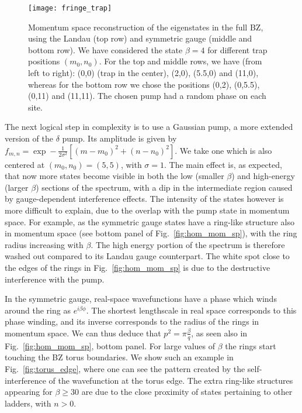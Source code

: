 \documentclass[twocolumn, 10pt, aps, superscriptaddress, floatfix, showpacs, pra, citeautoscript]{revtex4-1}
\newcommand{\co}[2]{#2}
\renewcommand{\paragraph}{\co}
\begin{document}
\begin{figure}[htb]
  \centering
  \texttt{[image: fringe\_trap]} %
  \caption{Momentum space reconstruction of the eigenstates in the
    full BZ, using the Landau (top row) and symmetric gauge (middle
    and bottom row). We have considered the state $\beta = 4$ for
    different trap positions $(m_0, n_0)$. For the top and middle
    rows, we have (from left to right): (0,0) (trap in the center),
    (2,0), (5.5,0) and (11,0), whereas for the bottom row we chose the
    positions (0,2), (0,5.5), (0,11) and (11,11). The chosen pump had
    a random phase on each site.}
  \label{fig:moving_trap}
\end{figure}

\paragraph{Gaussian pumping is now bound also in momentum space.}
The next logical step in complexity is to use a Gaussian pump, a more
extended version of the $\delta$ pump. Its amplitude is given by
$f_{m,n} = \exp- \frac{1}{2\sigma^2} \left[(m-m_0)^2 + (n-n_0)^2
\right]$.
We take one which is also centered at $(m_0,n_0) = (5,5)$, with
$\sigma =1$. The main effect is, as expected, that now more states
become visible in both the low (smaller $\beta$) and high-energy
(larger $\beta$) sections of the spectrum, with a dip in the
intermediate region caused by gauge-dependent interference
effects. The intensity of the states however is more difficult to
explain, due to the overlap with the pump state in momentum space. For
example, as the symmetric gauge states have a ring-like structure also
in momentum space (see bottom panel of Fig.~\ref{fig:hom_mom_sp}),
with the ring radius increasing with $\beta$. The high energy portion
of the spectrum is therefore washed out compared to its Landau gauge
counterpart. The white spot close to the edges of the rings in
Fig.~\ref{fig:hom_mom_sp} is due to the destructive interference with
the pump.

In the symmetric gauge, real-space wavefunctions have a phase which
winds around the ring as $e^{i\beta \phi}$. The shortest lengthscale
in real space corresponds to this phase winding, and its inverse
corresponds to the radius of the rings in momentum space. We can thus
deduce that $p^2 = \pi \frac{\beta}{q}$, as seen also in
Fig.~\ref{fig:hom_mom_sp}, bottom panel. For large values of $\beta$
the rings start touching the BZ torus boundaries. We show such an
example in Fig.~\ref{fig:torus_edge}, where one can see the pattern
created by the self-interference of the wavefunction at the torus
edge. The extra ring-like structures appearing for $\beta \geq 30$ are
due to the close proximity of states pertaining to other ladders, with
$n >0$.
\end{document}
